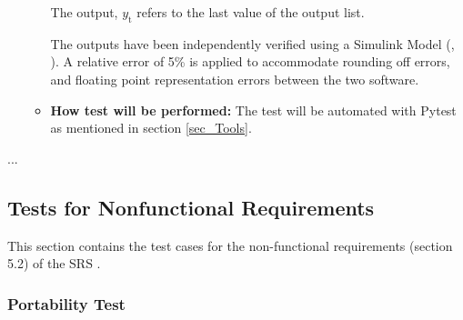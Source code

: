 \documentclass[12pt, titlepage]{article}
\begin{document}
\begin{itemize}
\begin{itemize}
The output, ${y_{\text{t}}}$ refers to the last value of the output list.

The outputs have been independently verified using a Simulink Model (\cite{Simulink}, 
\cite{PD_Controller}). A relative error of 5\% is applied to accommodate rounding off errors,
and floating point representation errors between the two software.

					
\item{\textbf{How test will be performed:}}  The test will be automated with Pytest as mentioned in 
section \ref{sec_Tools}. 

\end{itemize}
\end{itemize}

...
\subsection{Tests for Nonfunctional Requirements}


This section contains the test cases for the non-functional requirements (section
5.2) of the SRS \cite{SRS}.


\subsubsection{Portability Test}
\end{document}
